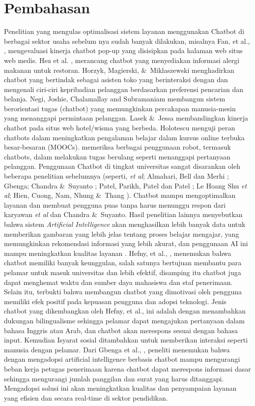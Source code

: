 \documentclass[conference]{IEEEtran}
\begin{document}
\section{Pembahasan}
Penelitian yang mengulas optimalisasi sistem layanan menggunakan Chatbot di berbagai sektor usaha sebelum nya sudah banyak dilakukan, misalnya Fan, et al., \cite{b6}, mengevaluasi kinerja chatbot pop-up yang disisipkan pada halaman web situs web medis. Hsu et al. \cite{b7}, merancang chatbot yang menyediakan informasi alergi makanan untuk restoran. Horzyk, Magierski, \&\ Miklaszewski \cite{b8}  menghadirkan chatbot yang bertindak sebagai asisten toko yang berinteraksi dengan dan mengenali ciri-ciri kepribadian pelanggan berdasarkan preferensi pencarian dan belanja. Negi, Joshie, Chalamallay and Subramaniam  \cite{b9} membangun sistem berorientasi tugas (chatbot) yang memungkinkan percakapan manusia-mesin yang menanggapi permintaan pelanggan. Lasek \&\ Jessa \cite{b10} membandingkan kinerja chatbot pada situs web hotel/wisma yang berbeda. Holotescu \cite{b11} menguji peran chatbots dalam meningkatkan pengalaman belajar dalam kursus online terbuka besar-besaran (MOOCs). memeriksa berbagai penggunaan robot, termasuk chatbots, dalam melakukan tugas berulang seperti menanggapi pertanyaan pelanggan.
Penggunaan Chatbot di tingkat universitas sangat disarankan oleh beberapa penelitian sebelumnya (seperti, \emph{et al}\cite{b19}; Almahari, Bell dan Merhi \cite{b20};  Gbenga\cite{b20}; Chandra \&\ Suyanto \cite{b21}; Patel, Parikh, Patel dan Patel \cite{b23}; Le Hoang Shu \emph{et al}\cite{b24}; Hien, Cuong, Nam, Nhung \&\ Thang \cite{b25}). Chatbot mampu mengoptimalkan layanan dan membuat pengguna puas tanpa harus menunggu respon dari karyawan \emph{et al}\cite{b19} dan Chandra \&\ Suyanto\cite{b22}. Hasil penelitian lainnya menyebutkan bahwa sistem \emph{Artificial Intelligence} akan menghasilkan lebih banyak data untuk memberikan gambaran yang lebih jelas tentang proses belajar mengajar, yang memungkinkan rekomendasi informasi yang lebih akurat, dan penggunaan AI ini mampu meningkatkan kualitas layanan \cite{b23}.
Hefny, et al., \cite{b26}, menemukan bahwa chatbot memiliki banyak keunggulan, salah satunya bertujuan membantu para pelamar  untuk masuk universitas dan lebih efektif, disamping itu chatbot juga dapat menghemat waktu dan sumber daya mahasiswa dan staf penerimaan. Selain itu, terbukti bahwa membangun chatbot yang dimotivasi oleh pengguna memiliki efek positif pada kepuasan pengguna dan adopsi teknologi. Jenis chatbot yang dikembangkan oleh Hefny, et al., \cite{b26} ini adalah dengan menambahkan dukungan bilingualisme sehingga pelamar dapat mengajukan pertanyaan dalam bahasa Inggris atau Arab, dan chatbot akan merespons sesuai dengan bahasa input. Kemudian Isyarat sosial ditambahkan untuk memberikan interaksi seperti manusia dengan pelamar. Dari Gbenga et al., \cite{b21},  peneliti menemukan bahwa dengan mengadopsi artificial intelligence berbasis chatbot mampu  mengurangi beban kerja petugas penerimaan karena chatbot dapat merespons informasi dasar sehingga mengurangi jumlah panggilan dan surat yang harus ditanggapi. Mengadopsi solusi ini akan meningkatkan kualitas dan penyampaian layanan yang efisien dan secara real-time di sektor pendidikan.
\end{document}
